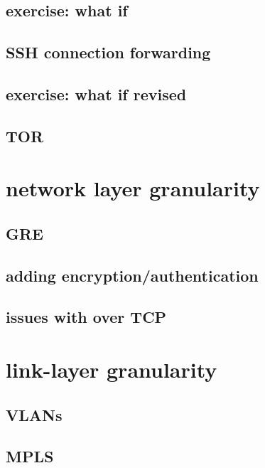 \subsection{exercise: what if}


\subsection{SSH connection forwarding}


\subsection{exercise: what if revised}


\subsection{TOR}

\section{network layer granularity}




\subsection{GRE}



\subsection{adding encryption/authentication}


\subsection{issues with over TCP}


\section{link-layer granularity}


\subsection{VLANs}



\subsection{MPLS}


